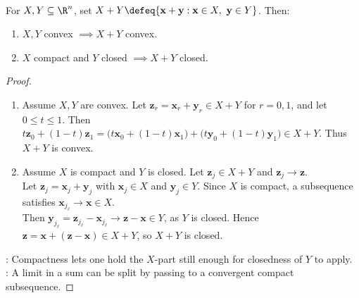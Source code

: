 \begin{proposition} \label{prop:minkowski-sum-convex-compact-closed} \\
For $X,Y\subseteq\R^n$, set $X+Y\defeq\{\mathbf{x}+\mathbf{y}:\mathbf{x}\in X,\ \mathbf{y}\in Y\}$. Then:
\begin{enumerate}[label=(\roman*)]
\setlength{\itemsep}{0pt}
\item $X,Y$ convex $\implies X+Y$ convex.
\item $X$ compact and $Y$ closed $\implies X+Y$ closed.
\end{enumerate}
\begin{proof}
\begin{enumerate}[label=(\roman*)]
\setlength{\itemsep}{0pt}
\item Assume $X,Y$ are convex. Let $\mathbf{z}_r=\mathbf{x}_r+\mathbf{y}_r\in X+Y$ for $r=0,1$, and let $0\leq t\leq1$. Then\\
$t\mathbf{z}_0+(1-t)\mathbf{z}_1 =\bigl(t\mathbf{x}_0+(1-t)\mathbf{x}_1\bigr) +\bigl(t\mathbf{y}_0+(1-t)\mathbf{y}_1\bigr)\in X+Y$. Thus $X+Y$ is convex.
\item Assume $X$ is compact and $Y$ is closed. Let $\mathbf{z}_j\in X+Y$ and $\mathbf{z}_j\to\mathbf{z}$.\\
Let $\mathbf{z}_j=\mathbf{x}_j+\mathbf{y}_j$ with $\mathbf{x}_j\in X$ and $\mathbf{y}_j\in Y$. Since $X$ is compact, a subsequence satisfies $\mathbf{x}_{j_\ell}\to\mathbf{x}\in X$.\\
Then $\mathbf{y}_{j_\ell}=\mathbf{z}_{j_\ell}-\mathbf{x}_{j_\ell}\to\mathbf{z}-\mathbf{x}\in Y$, as $Y$ is closed. Hence $\mathbf{z}=\mathbf{x}+(\mathbf{z}-\mathbf{x})\in X+Y$, so $X+Y$ is closed.
\end{enumerate}
: Compactness lets one hold the $X$-part still enough for closedness of $Y$ to apply.\\
: A limit in a sum can be split by passing to a convergent compact subsequence.
\end{proof}
\end{proposition}

